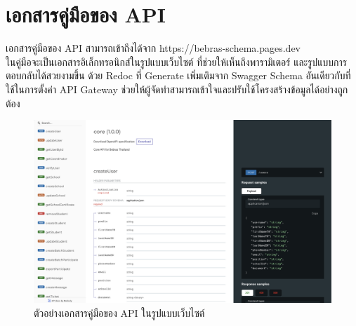 \chapter{เอกสารคู่มือของ API}

เอกสารคู่มือของ API สามารถเข้าถึงได้จาก https://bebras-schema.pages.dev \\

ในคู่มือจะเป็นเอกสารอิเล็กทรอนิกส์ในรูปแบบเว็บไซต์ ที่ช่วยให้เห็นถึงพารามิเตอร์ และรูปแบบการตอบกลับได้สวยงามขึ้น ด้วย Redoc ที่ Generate เพิ่มเติมจาก Swagger Schema อันเดียวกับที่ใช้ในการตั้งค่า API Gateway ช่วยให้ผู้จัดทำสามารถเข้าใจและปรับใช้โครงสร้างข้อมูลได้อย่างถูกต้อง

\begin{figure}[H]
    \centering
    \includegraphics[width=125mm,scale=1.0]{images/redoc-schema.png}
    \caption{ตัวอย่างเอกสารคู่มือของ API ในรูปแบบเว็บไซต์}
    \label{fig:redoc-schema}
\end{figure}

